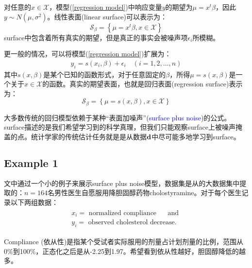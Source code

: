 \documentclass[lang=cn,11pt,a4paper,cite=authoryear]{elegantpaper}
\begin{document}
对任意的$x \in \mathcal{X}$，模型(\ref{regression model})中响应变量$y$的期望为$\mu = x^t \beta$，因此$y \sim N(\mu, \sigma^2)$。线性表面(linear surface)可以表示为：
\begin{equation}
\mathcal{S}_{\beta}=\left\{\mu=x^{t} \beta, x \in \mathcal{X}\right\}
\end{equation}
surface中包含着所有真实的期望，但是真正的事实会被噪声项$\epsilon_i$所模糊。

更一般的情况，可以将模型(\ref{regression model})扩展为：
\begin{align}
\label{general regression model}
y_{i}=s(x_i, \beta)+\epsilon_{i} \quad(i=1,2, \ldots, n)
\end{align}
其中$s(x, \beta)$是某个已知的函数形式，对于任意固定的$\beta$，所得$\mu = s(x, \beta)$是一个关于$x \in \mathcal{X}$的函数。真实的期望表面，也就是回归表面(regression surface)表示为：
\begin{equation}
\mathcal{S}_{\beta}=\left\{\mu=s(x, \beta), x \in \mathcal{X}\right\}
\end{equation}

大多数传统的回归模型依赖于某种“表面加噪声”(\textcolor{blue}{surface plus noise})的公式。surface描述的是我们希望学习到的科学真理，但我们只能观察surface上被噪声掩盖的点。统计学家的传统估计任务就是是从数据$\bold{d}$中尽可能多地学习到surface。

\subsection{Example 1}

文中通过一个小的例子来展示surface plus noise模型，数据集是从\cite{efron1991compliance}的大数据集中提取的：$n=164$名男性医生自愿服用降胆固醇药物cholostyramine。对于每个医生记录以下两组数据：
\begin{align}
\begin{array}{l}
x_{i}=\text { normalized compliance } \quad \text { and } \\
y_{i}=\text { observed cholesterol decrease. }
\end{array}
\end{align}

Compliance (依从性)是指某个受试者实际服用的剂量占计划剂量的比例，范围从0\%到100\%，正态化之后是从-2.25到1.97。希望看到依从性越好，胆固醇降低的越多。
\end{document}
